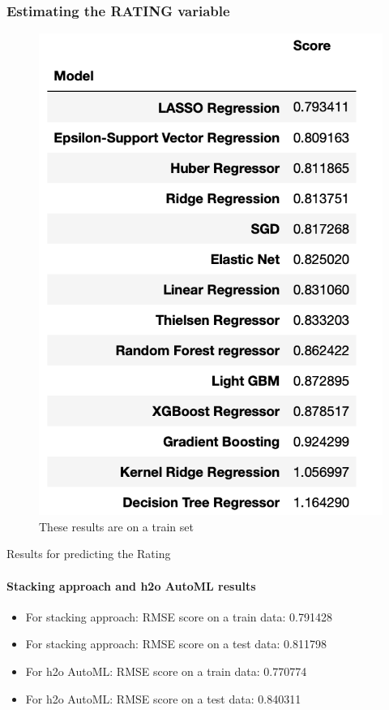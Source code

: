 \documentclass[11pt]{beamer}
\begin{document}
\begin{frame}
\frametitle{Estimating the RATING variable}
\begin{figure}
	\centering
	\includegraphics[scale =0.45]{Table1Rating}
	\caption{These results are on a train set}
\end{figure}		
\end{frame}

\begin{frame}{Results for predicting the Rating}
	\framesubtitle{ Stacking approach and h2o AutoML results}
	\begin{itemize}
		\item For stacking approach:
		RMSE score on a train data: 0.791428
		\pause 
		\item For stacking approach:
		RMSE score on a test data: 0.811798
		\pause 
		\item For h2o AutoML:
		RMSE score on a train data:  0.770774
		\pause 
		\item For h2o AutoML:
		RMSE score on a test data: 0.840311
	\end{itemize}
\end{frame}
\end{document}
